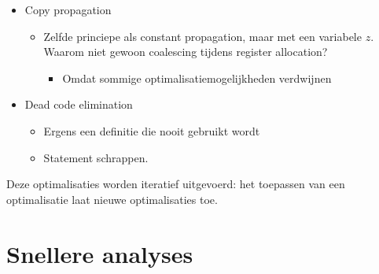 \begin{itemize}
\begin{itemize}
		
	\end{itemize}
	\item Copy propagation
	\begin{itemize}
		\item Zelfde princiepe als constant propagation, maar met een variabele $z$.
		\alert Waarom niet gewoon coalescing tijdens register allocation?
		\begin{itemize}
			\item Omdat sommige optimalisatiemogelijkheden  verdwijnen
		\end{itemize}
	\end{itemize}
	\item Dead code elimination
	\begin{itemize}
		\item Ergens een definitie die nooit gebruikt wordt
		\item Statement schrappen.
	\end{itemize}
\end{itemize}

Deze optimalisaties worden iteratief uitgevoerd: het toepassen van een optimalisatie laat nieuwe optimalisaties toe.

\section{Snellere analyses}

